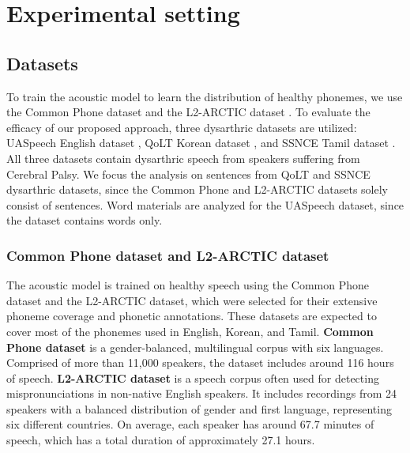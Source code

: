 \section{Experimental setting} \label{sec:experiment}

\subsection{Datasets} \label{ssec:corpus}
To train the acoustic model to learn the distribution of healthy phonemes, we use the Common Phone dataset \cite{klumpp2022common} and the L2-ARCTIC dataset \cite{zhao2018l2}.
To evaluate the efficacy of our proposed approach, three dysarthric datasets are utilized: UASpeech English dataset \cite{kim2008uaspeech}, QoLT Korean dataset \cite{choi2012dysarthric}, and SSNCE Tamil dataset \cite{ta2016dysarthric}.
All three datasets contain dysarthric speech from speakers suffering from Cerebral Palsy.
We focus the analysis on sentences from QoLT and SSNCE dysarthric datasets, since the Common Phone and L2-ARCTIC datasets solely consist of sentences.
Word materials are analyzed for the UASpeech dataset, since the dataset contains words only. 


\subsubsection{Common Phone dataset and L2-ARCTIC dataset} \label{sssec:commonPhone}
The acoustic model is trained on healthy speech using the Common Phone dataset and the L2-ARCTIC dataset, which were selected for their extensive phoneme coverage and phonetic annotations.
These datasets are expected to cover most of the phonemes used in English, Korean, and Tamil.
\textbf{Common Phone dataset} \cite{klumpp2022common} is a gender-balanced, multilingual corpus with six languages.
Comprised of more than 11,000 speakers, the dataset includes around 116 hours of speech.
\textbf{L2-ARCTIC dataset} \cite{zhao2018l2} is a speech corpus often used for detecting mispronunciations in non-native English speakers. 
It includes recordings from 24 speakers with a balanced distribution of gender and first language, representing six different countries. 
On average, each speaker has around 67.7 minutes of speech, which has a total duration of approximately 27.1 hours.


